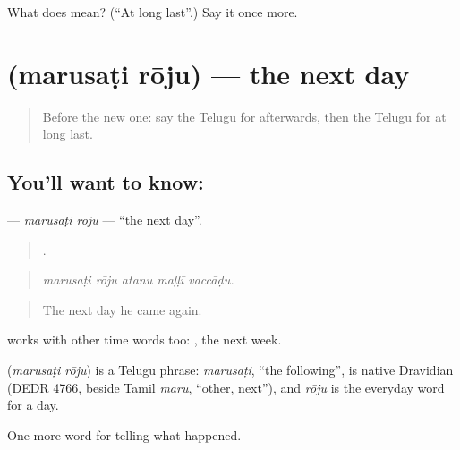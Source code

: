 \begin{tcolorbox}[breakable,colback=teal!4,colframe=teal!35!black,title={Before you move on}]
What does  mean? (\textquotedblleft{}At long last\textquotedblright{}.) Say it once more.
\end{tcolorbox}
\section[\texorpdfstring{\te{మరుసటి} \te{రోజు} (marusaṭi rōju)}{మరుసటి రోజు (marusaṭi rōju)}]{  (marusaṭi rōju) — the next day}

\label{lesson:TE-C328-marusati-roju}



\begin{quote}
Before the new one: say the Telugu for afterwards, then the Telugu for at long last.
\end{quote}

\subsection*{You'll want to know:  }
\textbf{ } — \emph{marusaṭi rōju} — \textquotedblleft{}the next day\textquotedblright{}.

\begin{quote}
    .
\end{quote}

\begin{quote}
\emph{marusaṭi rōju atanu maḷḷī vaccāḍu.}
\end{quote}

\begin{quote}
The next day he came again.
\end{quote}

 works with other time words too:  , the next week.

\begin{cousinweb}
\textbf{ } (\emph{marusaṭi rōju}) is a Telugu phrase: \emph{marusaṭi}, \textquotedblleft{}the following\textquotedblright{}, is native Dravidian (DEDR 4766, beside Tamil \emph{maṟu}, \textquotedblleft{}other, next\textquotedblright{}), and \emph{rōju} is the everyday word for a day.
\end{cousinweb}

\begin{grammarlens}[title={What you've built}]
One more word for telling what happened.
\end{grammarlens}

